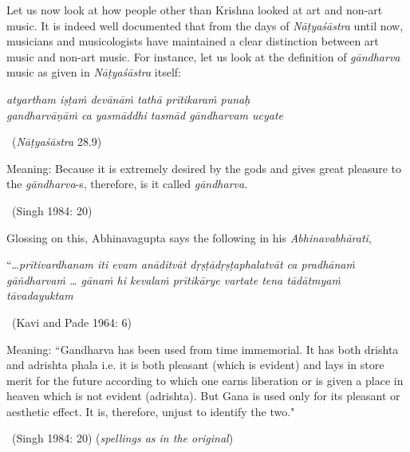 Let us now look at how people other than Krishna looked at art and non-art music. It is indeed well documented that from the days of \textit{Nāṭyaśāstra} until now, musicians and musicologists have maintained a clear distinction between art music and non-art music. For instance, let us look at the definition of \textit{gāndharva} music as given in \textit{Nāṭyaśāstra} itself:

\begin{myquote}
\textit{atyartham iṣṭaṁ devānāṁ tathā prītikaraṁ punaḥ }\\ \textit{gandharvāṇāṁ ca yasmāddhi tasmād gāndharvam ucyate } 

~\hfill (\textit{Nāṭyaśāstra} 28.9)
\end{myquote}

\begin{myquote}
Meaning: Because it is extremely desired by the gods and gives great pleasure to the \textit{gāndharva}-s, therefore, is it called \textit{gāndharva}. 

~\hfill (Singh 1984: 20)
\end{myquote}

Glossing on this, Abhinavagupta says the following in his \textit{Abhinavabhārati},

\begin{myquote}
“…\textit{prītivardhanam iti evam anāditvāt dṛṣṭādṛṣṭaphalatvāt ca pradhānaṁ gāṅdharvaṁ … gānaṁ hi kevalaṁ prītikārye vartate  tena tādātmyaṁ tāvadayuktam } 

\vspace{-.2cm}

~\hfill (Kavi and Pade 1964: 6)
\end{myquote}

\begin{myquote}
Meaning: ``Gandharva has been used from time immemorial. It has both drishta and adrishta phala i.e. it is both pleasant (which is evident) and lays in store merit for the future according to which one earns liberation or is given a place in heaven which is not evident (adrishta). But Gana is used only for its pleasant or aesthetic effect. It is, therefore, unjust to identify the two." 

\vspace{-.2cm}

~\hfill (Singh 1984: 20) (\textit{spellings as in the original})
\end{myquote}

